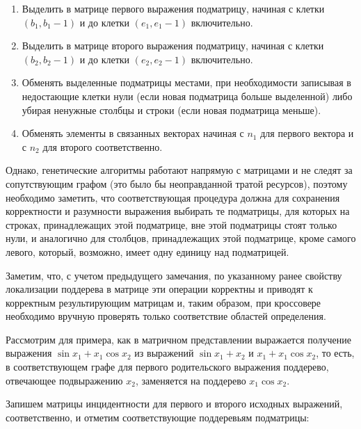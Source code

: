 \documentclass[12pt,a4paper]{amsart}
\begin{document}
\begin{enumerate}
  \item Выделить в матрице первого выражения подматрицу, начиная с клетки $ (b_1, b_1 - 1) $ и до клетки
	$ (e_1, e_1 - 1) $ включительно.
  \item Выделить в матрице второго выражения подматрицу, начиная с клетки $ (b_2, b_2 - 1) $ и до клетки
	$ (e_2, e_2 - 1) $ включительно.
  \item Обменять выделенные подматрицы местами, при необходимости записывая в недостающие клетки нули (если новая
	подматрица больше выделенной) либо убирая ненужные столбцы и строки (если новая подматрица меньше).
  \item Обменять элементы в связанных векторах начиная с $ n_1 $ для первого вектора и с $ n_2 $ для второго
	соответственно.
\end{enumerate}

Однако, генетические алгоритмы работают напрямую с матрицами и не следят за сопутствующим графом (это было бы
неоправданной тратой ресурсов), поэтому необходимо заметить, что соответствующая процедура должна для сохранения
корректности и разумности выражения выбирать те подматрицы, для которых на строках, принадлежащих этой подматрице,
вне этой подматрицы стоят только нули, и аналогично для столбцов, принадлежащих этой подматрице, кроме самого левого,
который, возможно, имеет одну единицу над подматрицей.

Заметим, что, с учетом предыдущего замечания, по указанному ранее свойству локализации поддерева в матрице эти
операции корректны и приводят к корректным результирующим матрицам и, таким образом, при кроссовере необходимо
вручную проверять только соответствие областей определения.

Рассмотрим для примера, как в матричном представлении выражается получение выражения $ \sin x_1 + x_1 \cos x_2 $ из
выражений $ \sin x_1 + x_2 $ и $ x_1 + x_1 \cos x_2 $, то есть, в соответствующем графе для первого родительского
выражения поддерево, отвечающее подвыражению $ x_2 $, заменяется на поддерево $ x_1 \cos x_2 $.

Запишем матрицы инцидентности для первого и второго исходных выражений, соответственно, и отметим соответствующие
поддеревьям подматрицы:
\end{document}
